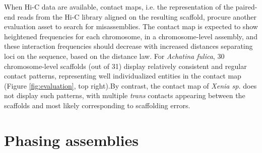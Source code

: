 When Hi-C data are available, contact maps, i.e. the representation of the paired-end reads from the Hi-C library aligned on the resulting scaffold, procure another evaluation asset to search for misassemblies. The contact map is expected to show heightened frequencies for each chromosome, in a chromosome-level assembly, and these interaction frequencies should decrease with increased distances separating loci on the sequence, based on the distance law. For \textit{Achatina fulica}, 30 chromosome-level scaffolds (out of 31) display relatively consistent and regular contact patterns, representing well individualized entities in the contact map (Figure \ref{fig:evaluation}, top right).By contrast, the contact map of \textit{Xenia sp.} does not display such patterns, with multiple \textit{trans} contacts appearing between the scaffolds and most likely corresponding to scaffolding errors. \\

\section{Phasing assemblies}

